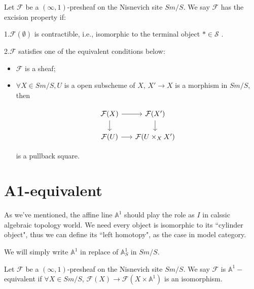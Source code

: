 \begin{definition}

Let $\mathcal{F}$ be a $(\infty,1)$-presheaf on the Nisnevich site $Sm/S$. We say $\mathcal{F}$ has the excision property if:

1.$\mathcal{F}(\emptyset)$ is contractible, i.e., isomorphic to the terminal object $*\in \mathscr{S}$ .

2.$\mathcal{F} $ satisfies one of the equivalent\cite{MorelVoevodsky1999} conditions below:
\begin{itemize}
    \item $\mathcal{F}$ is a sheaf;
    \item $\forall X\in Sm/S, U$ is a open subscheme of $X$, $X'\to X$ is a morphism in $Sm/S$, then 

    \begin{equation*}
\begin{tikzcd}[row sep=1.5em, column sep=1.5em]
\mathcal{F}(X) \arrow[r] \arrow[d] & \mathcal{F}(X') \arrow[d] \\
\mathcal{F}(U) \arrow[r] & \mathcal{F}(U \times_X X')
\end{tikzcd}
\end{equation*}

is a pullback square.
\end{itemize}


\end{definition}

\section{A1-equivalent}

As we've mentioned, the affine line $\mathbb{A}^1$ should play the role as $I$ in calssic algebraic topology world. We need every object is isomorphic to its ``cylinder object", thus we can define its ``left homotopy", as the case in model category.

\begin{remark}
    We will simply write $\mathbb{A}^1$ in replace of $\mathbb{A}^1_S$ in $Sm/S$.
\end{remark}

\begin{definition}
Let $\mathcal{F}$ be a $(\infty,1)$-presheaf on the Nisnevich site $Sm/S$. We say $\mathcal{F}$ is $\mathbb{A}^1-$equivalent if $\forall X\in Sm/S$, $\mathcal{F}(X)\to \mathcal{F}(X\times \mathbb{A}^1)$ is an isomorphism.
\end{definition}

